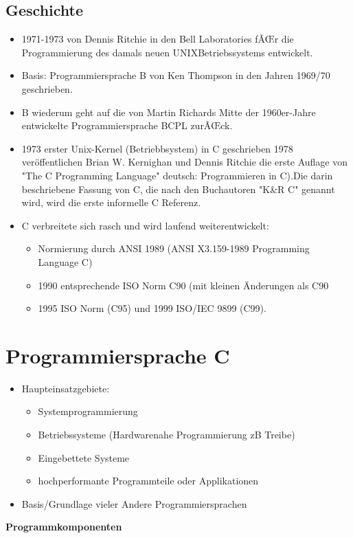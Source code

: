\documentclass[10pt,a5paper]{article}
\begin{document}
\subsection{Geschichte}
\begin{itemize}
\item 1971-1973 von Dennis Ritchie in den Bell Laboratories fÃŒr die Programmierung des damals neuen UNIXBetriebssystems entwickelt.
\item Basis: Programmiersprache B von Ken Thompson in den Jahren 1969/70 geschrieben.
\item B wiederum geht auf die von Martin Richards Mitte der 1960er-Jahre entwickelte Programmiersprache BCPL zurÃŒck. 
\item 1973 erster Unix-Kernel (Betriebbsystem) in C geschrieben 1978 veröffentlichen Brian W. Kernighan und Dennis Ritchie die erste Auflage von "The C Programming Language" deutsch: Programmieren in C).Die darin beschriebene Fassung von C, die nach den Buchautoren "K\&R C" genannt wird, wird die erste  informelle C Referenz.

\item C verbreitete sich rasch und wird laufend weiterentwickelt:
 \begin{itemize}
\item Normierung durch ANSI 1989 (ANSI X3.159-1989 Programming Language C)
\item 1990 entsprechende ISO Norm C90 (mit kleinen Änderungen als C90
\item 1995 ISO Norm (C95) und 1999 ISO/IEC 9899 (C99).

\end{itemize}
\end{itemize}
\section{Programmiersprache C}
\begin{itemize}
\item Haupteinsatzgebiete: \begin{itemize}
\item Systemprogrammierung
\item Betriebssysteme (Hardwarenahe Programmierung zB Treibe)
\item Eingebettete Systeme
\item hochperformante Programmteile oder Applikationen
\end{itemize}
\item Basis/Grundlage vieler Andere Programmiersprachen
\end{itemize}
\textbf{Programmkomponenten}
\end{document}

